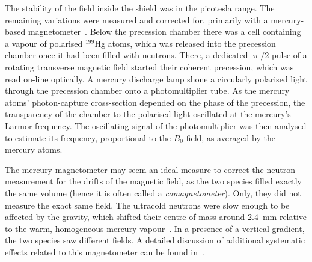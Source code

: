 The stability of the field inside the shield was in the picotesla range. The remaining variations were measured and corrected for, primarily with a mercury-based magnetometer~\cite{FertlThesis,Komposch2017}. Below the precession chamber there was a cell containing a vapour of polarised $^{199}$Hg atoms, which was released into the precession chamber once it had been filled with neutrons.
There, a dedicated $\uppi/2$ pulse of a rotating transverse magnetic field started their coherent precession, which was read on-line optically. A mercury discharge lamp shone a circularly polarised light through the precession chamber onto a photomultiplier tube. As the mercury atoms' photon-capture cross-section depended on the phase of the precession, the transparency of the chamber to the polarised light oscillated at the mercury's Larmor frequency. The oscillating signal of the photomultiplier was then analysed to estimate its frequency, proportional to the $B_0$ field, as averaged by the mercury atoms.

The mercury magnetometer may seem an ideal measure to correct the neutron measurement for the drifts of the magnetic field, as the two species filled exactly the same volume (hence it is often called a \emph{comagnetometer}). Only, they did not measure the exact same field. The ultracold neutrons were slow enough to be affected by the gravity, which shifted their centre of mass around \SI{2.4}{\milli\meter} relative to the warm, homogeneous mercury vapour~\cite{Afach2014magmoment}. In a presence of a vertical gradient, the two species saw different fields. A detailed discussion of additional systematic effects related to this magnetometer can be found in~\cite{Afach2014magmoment}.

